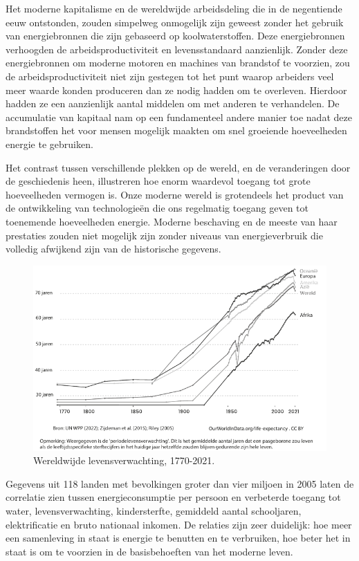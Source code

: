 Het moderne kapitalisme en de wereldwijde arbeidsdeling die in de negentiende eeuw ontstonden, zouden simpelweg onmogelijk zijn geweest zonder het gebruik van energiebronnen die zijn gebaseerd op koolwaterstoffen. Deze energiebronnen verhoogden de arbeidsproductiviteit en levensstandaard aanzienlijk. Zonder deze energiebronnen om moderne motoren en machines van brandstof te voorzien, zou de arbeidsproductiviteit niet zijn gestegen tot het punt waarop arbeiders veel meer waarde konden produceren dan ze nodig hadden om te overleven. Hierdoor hadden ze een aanzienlijk aantal middelen om met anderen te verhandelen. De accumulatie van kapitaal nam op een fundamenteel andere manier toe nadat deze brandstoffen het voor mensen mogelijk maakten om snel groeiende hoeveelheden energie te gebruiken.

Het contrast tussen verschillende plekken op de wereld, en de veranderingen door de geschiedenis heen, illustreren hoe enorm waardevol toegang tot grote hoeveelheden vermogen is. Onze moderne wereld is grotendeels het product van de ontwikkeling van technologieën die ons regelmatig toegang geven tot toenemende hoeveelheden energie. Moderne beschaving en de meeste van haar prestaties zouden niet mogelijk zijn zonder niveaus van energieverbruik die volledig afwijkend zijn van de historische gegevens.

\begin{figure}[!htb]
\centering
    \includegraphics[width=\textwidth]{figures/fig12.pdf}
    \caption[Wereldwijde levensverwachting, 1770-2021]{Wereldwijde levensverwachting, 1770-2021.}
    \label{fig12}
\end{figure}

Gegevens uit 118 landen met bevolkingen groter dan vier miljoen in 2005 laten de correlatie zien tussen energieconsumptie per persoon en verbeterde toegang tot water, levensverwachting, kindersterfte, gemiddeld aantal schooljaren, elektrificatie en bruto nationaal inkomen. \autocite{100} De relaties zijn zeer duidelijk: hoe meer een samenleving in staat is energie te benutten en te verbruiken, hoe beter het in staat is om te voorzien in de basisbehoeften van het moderne leven.

